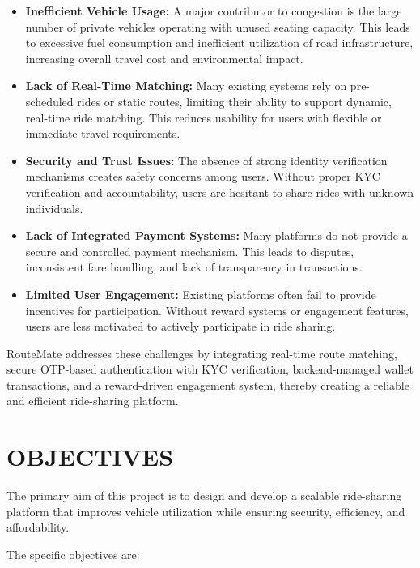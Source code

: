 \documentclass[10pt,a4paper]{report}
\begin{document}
\begin{itemize}
    \item \textbf{Inefficient Vehicle Usage:} A major contributor to congestion is the large number of private vehicles operating with unused seating capacity. This leads to excessive fuel consumption and inefficient utilization of road infrastructure, increasing overall travel cost and environmental impact.

    \item \textbf{Lack of Real-Time Matching:} Many existing systems rely on pre-scheduled rides or static routes, limiting their ability to support dynamic, real-time ride matching. This reduces usability for users with flexible or immediate travel requirements.

    \item \textbf{Security and Trust Issues:} The absence of strong identity verification mechanisms creates safety concerns among users. Without proper KYC verification and accountability, users are hesitant to share rides with unknown individuals.

    \item \textbf{Lack of Integrated Payment Systems:} Many platforms do not provide a secure and controlled payment mechanism. This leads to disputes, inconsistent fare handling, and lack of transparency in transactions.

    \item \textbf{Limited User Engagement:} Existing platforms often fail to provide incentives for participation. Without reward systems or engagement features, users are less motivated to actively participate in ride sharing.
\end{itemize}

\large\justify RouteMate addresses these challenges by integrating real-time route matching, secure OTP-based authentication with KYC verification, backend-managed wallet transactions, and a reward-driven engagement system, thereby creating a reliable and efficient ride-sharing platform.

\section{\textbf{OBJECTIVES}}
\large\justify
The primary aim of this project is to design and develop a scalable ride-sharing platform that improves vehicle utilization while ensuring security, efficiency, and affordability.

\large\justify The specific objectives are:
\end{document}
